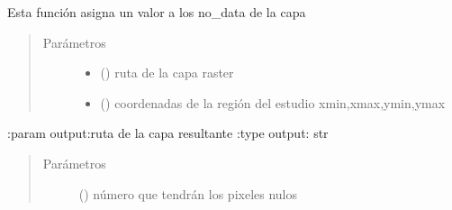 \documentclass[letterpaper,10pt,spanish]{sphinxmanual}
\begin{document}
\begin{fulllineitems}
\label{\detokenize{apcsig:apcsig.asignar_nulls}}
Esta función asigna un valor  a los no\_data de la capa
\begin{quote}\begin{description}
\item[{Parámetros}] \leavevmode\begin{itemize}
\item {} 
 () \textendash{} ruta de la capa raster

\item {} 
 () \textendash{} coordenadas de la región del estudio  xmin,xmax,ymin,ymax

\end{itemize}

\end{description}\end{quote}

:param output:ruta de la capa resultante
:type output: str
\begin{quote}\begin{description}
\item[{Parámetros}] \leavevmode
{} () \textendash{} número que tendrán los pixeles nulos

\end{description}\end{quote}

\end{fulllineitems}

\end{document}
